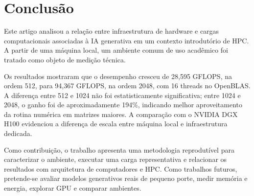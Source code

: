 \section{Conclusão}
\label{sec:conclusao}

Este artigo analisou a relação entre infraestrutura de hardware e cargas computacionais associadas à IA generativa em um contexto introdutório de HPC. A partir de uma máquina local, um ambiente comum de uso acadêmico foi tratado como objeto de medição técnica.

Os resultados mostraram que o desempenho cresceu de 28,595 GFLOPS, na ordem 512, para 94,367 GFLOPS, na ordem 2048, com 16 threads no OpenBLAS. A diferença entre 512 e 1024 não foi estatisticamente significativa; entre 1024 e 2048, o ganho foi de aproximadamente 194\%, indicando melhor aproveitamento da rotina numérica em matrizes maiores. A comparação com o NVIDIA DGX H100 evidenciou a diferença de escala entre máquina local e infraestrutura dedicada.

Como contribuição, o trabalho apresenta uma metodologia reprodutível para caracterizar o ambiente, executar uma carga representativa e relacionar os resultados com arquitetura de computadores e HPC. Como trabalhos futuros, pretende-se avaliar modelos generativos reais de pequeno porte, medir memória e energia, explorar GPU e comparar ambientes.
